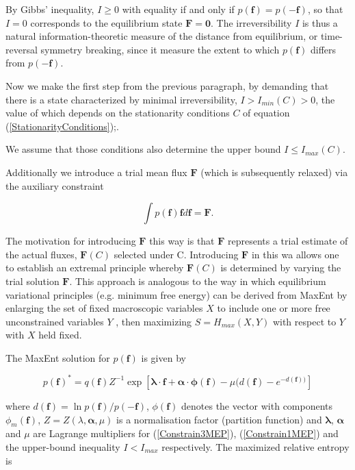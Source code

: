 \documentclass[a4paper,12pt]{article}
\begin{document}
By Gibbs' inequality, $I \geq 0$ with equality if and only if $p(\bm{f})=p(-\bm{f})$, so that $I=0$ corresponds to the equilibrium state $\bm{F} = \bm{0} $. The irreversibility $I$ is thus a natural information-theoretic measure of the distance from equilibrium, or time-reversal symmetry breaking, since it measure the extent to which $p(\bm{f} ) $ differs from $p(\bm{-f} ) $.

Now we make the first step from the previous paragraph, by demanding that there is a state characterized by minimal irreversibility, $I>I_{min}(C)>0$, the value of which depends on the stationarity conditions $C$ of equation (\ref{StationarityConditions});.

We assume that those conditions also determine the upper bound $I \leq I_{max}(C)$.

Additionally we introduce a trial mean flux $\bm{F}$ (which is subsequently relaxed) via the auxiliary constraint

\begin{equation}
\label{Constrain3MEP}
  \int p(\bm{f})\bm{f} d\bm{f} = \bm{F}.
\end{equation}

The motivation for introducing $\bm{F}$ this way is that $\bm{F}$ represents a trial estimate of the actual fluxes, $\bm{F}(C)$ selected under C. Introducing $\bm{F}$ in this wa allows one to establish an extremal principle whereby $\bm{F}(C)$ is determined by varying the trial solution $\bm{F}$.
This approach is analogous to the way in which equilibrium variational principles (e.g. minimum free energy) can be derived from MaxEnt by enlarging the set of fixed macroscopic variables $X$ to include one or more free unconstrained variables $Y$ , then maximizing $S=H_{max}(X,Y)$ with respect to $Y$ with $X$ held fixed.

The MaxEnt solution for $p(\bm{f})$ is given by 

\begin{equation}
  p(\bm{f})^* = q( \bm{f} ) Z^{-1} \exp[\bm{\lambda} \cdot \bm{f}+ \bm{\alpha} \cdot \bm{\phi} (\bm{f}) - \mu ( d(\bm{f}) - e^{-d(\bm{f}))}]
\end{equation}

where $d(\bm{f})= \ln{p(\bm{f})/p(-\bm{f})}$, $\phi(\bm{f})$ denotes the vector with components $\phi_m(\bm{f})$, $Z = Z(\lambda, \bm{\alpha},\mu)$ is a normalisation factor (partition function) and $\bm{\lambda}$, $\bm{\alpha}$ and $\mu$ are Lagrange multipliers for (\ref{Constrain3MEP}), (\ref{Constrain1MEP}) and the upper-bound inequality $I<I_{max}$ respectively. The maximized relative entropy is
\end{document}
